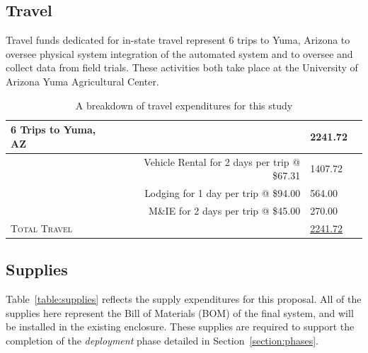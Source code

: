 \documentclass[letterpaper]{article}
\begin{document}
{{\subsection{Travel}
Travel funds dedicated for in-state travel represent 6 trips to Yuma, Arizona to oversee physical system integration of the automated system and to oversee and collect data from field trials. These activities both take place at the University of Arizona Yuma Agricultural Center.
\begin{table}[H] %
\centering
\begin{tabular}{lrlr}
 	\toprule
	\toprule
	6 Trips to Yuma, AZ & & 2241.72 \\
	\midrule
	& Vehicle Rental for 2 days per trip @ \$67.31 & 1407.72 \\
	& Lodging for 1 day per trip @ \$94.00 & 564.00 \\
	& M\&IE for 2 days per trip @ \$45.00 & 270.00 \\
	\toprule
	\toprule
	\textsc{Total Travel}                      & & \underline{2241.72} \\
	\bottomrule
    \bottomrule                
\end{tabular}
\caption[Travel Budget Breakdown]{A breakdown of travel expenditures for this study}
\label{table:travel}
\end{table}

%
%
\subsection{Supplies}
Table~\ref{table:supplies} reflects the supply expenditures for this proposal. All of the supplies here represent the Bill of Materials (BOM) of the final system, and will be installed in the existing enclosure. These supplies are required to support the completion of the \textit{deployment} phase detailed in Section~\ref{section:phases}.\\

}}
\end{document}
